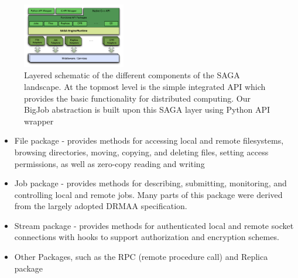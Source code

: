 \documentclass[conference,final]{IEEEtran}
\newcommand{\skonote}[1]{ {\textcolor{blue} { ***Jeff: #1 }}}
\newcommand{\skonote}[1]{}
\begin{document}
\begin{figure}[!ht]
 \begin{center}
     \includegraphics[width=0.40\textwidth]{stci_saga_figures-1.pdf}
 \end{center}
\caption{\small Layered schematic of the different components
  of the SAGA landscape. At the topmost level is the simple integrated API which provides the basic functionality for distributed computing. Our BigJob abstraction is built upon this SAGA layer using Python API wrapper} \label{Fig:SAGA1}
\end{figure}



\begin{itemize}
\item File package - provides methods for accessing local and remote
 filesystems, browsing directories, moving, copying, and deleting
 files, setting access permissions, as well as zero-copy reading and
 writing
\item Job package - provides methods for describing, submitting,
 monitoring, and controlling local and remote jobs. Many parts of
 this package were derived from the largely adopted
 DRMAA %
 specification.
\item Stream package - provides methods for authenticated local and
 remote socket connections with hooks to support authorization and
 encryption schemes.
\item Other Packages, such as the RPC (remote procedure call) and Replica
 package
\end{itemize}



\end{document}
